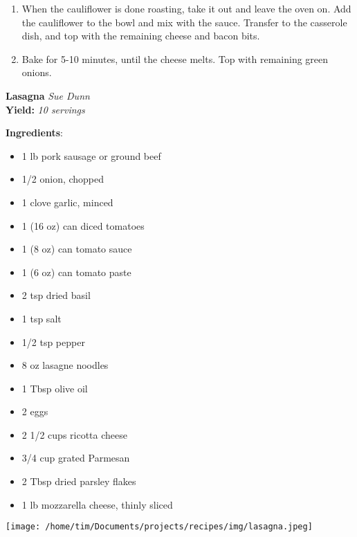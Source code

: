 \documentclass[11pt, twoside, openany]{book}
\begin{document}
\begin{minipage}[t]{\linewidth}
\begin{enumerate}
\item When the cauliflower is done roasting, take it out and leave the oven on. Add the cauliflower to the bowl and mix with the sauce. Transfer to the casserole dish, and top with the remaining cheese and bacon bits.
\item Bake for 5-10 minutes, until the cheese melts. Top with remaining green onions.
\end{enumerate}
\end{minipage}\vspace{8mm}
\noindent\begin{minipage}[t]{\linewidth}%
{\Large\textbf{Lasagna}} \label{lasagna}\hfill\textit{Sue Dunn}\\
\textbf{Yield:} \textit{10 servings}\\
\noindent\begin{minipage}[t]{0.78\linewidth}%
\textbf{Ingredients}:\vspace{-3mm}
\begin{multicols}{2}
\begin{itemize}\setlength\itemsep{-1mm}
\item 1 lb pork sausage or ground beef
\item 1/2 onion, chopped
\item 1 clove garlic, minced
\item 1 (16 oz) can diced tomatoes
\item 1 (8 oz) can tomato sauce
\item 1 (6 oz) can tomato paste
\item 2 tsp dried basil
\item 1 tsp salt
\item 1/2 tsp pepper
\item 8 oz lasagne noodles
\item 1 Tbsp olive oil
\item 2 eggs
\item 2 1/2 cups ricotta cheese
\item 3/4 cup grated Parmesan
\item 2 Tbsp dried parsley flakes
\item 1 lb mozzarella cheese, thinly sliced
\end{itemize}
\end{multicols}
\end{minipage}
\noindent\begin{minipage}[t]{0.18\linewidth}
\centering \strut\vspace*{-\baselineskip}\newline
\texttt{[image: /home/tim/Documents/projects/recipes/img/lasagna.jpeg]}\\

\end{minipage}
\end{minipage}
\end{document}
